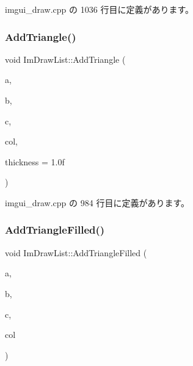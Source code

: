  imgui\+\_\+draw.\+cpp の 1036 行目に定義があります。

\mbox{\label{struct_im_draw_list_ad04c8e04644b1cf54c7c7b8f352d5e41}} 
\subsubsection{\texorpdfstring{Add\+Triangle()}{AddTriangle()}}
{\footnotesize\ttfamily void Im\+Draw\+List\+::\+Add\+Triangle (\begin{DoxyParamCaption}\item[{const \mbox{\hyperlink{struct_im_vec2}{Im\+Vec2}} \&}]{a,  }\item[{const \mbox{\hyperlink{struct_im_vec2}{Im\+Vec2}} \&}]{b,  }\item[{const \mbox{\hyperlink{struct_im_vec2}{Im\+Vec2}} \&}]{c,  }\item[{\mbox{\hyperlink{imgui_8h_a118cff4eeb8d00e7d07ce3d6460eed36}{Im\+U32}}}]{col,  }\item[{float}]{thickness = {\ttfamily 1.0f} }\end{DoxyParamCaption})}



 imgui\+\_\+draw.\+cpp の 984 行目に定義があります。

\mbox{\label{struct_im_draw_list_a2395370cf2dab19fce3c0e2542cd4f25}} 
\subsubsection{\texorpdfstring{Add\+Triangle\+Filled()}{AddTriangleFilled()}}
{\footnotesize\ttfamily void Im\+Draw\+List\+::\+Add\+Triangle\+Filled (\begin{DoxyParamCaption}\item[{const \mbox{\hyperlink{struct_im_vec2}{Im\+Vec2}} \&}]{a,  }\item[{const \mbox{\hyperlink{struct_im_vec2}{Im\+Vec2}} \&}]{b,  }\item[{const \mbox{\hyperlink{struct_im_vec2}{Im\+Vec2}} \&}]{c,  }\item[{\mbox{\hyperlink{imgui_8h_a118cff4eeb8d00e7d07ce3d6460eed36}{Im\+U32}}}]{col }\end{DoxyParamCaption})}



